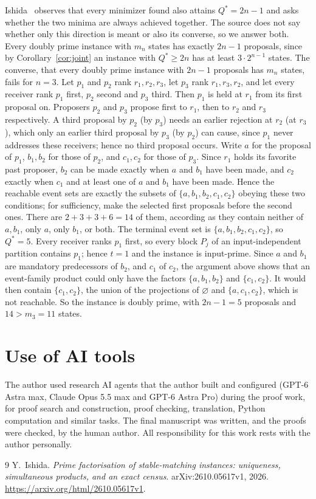 \documentclass[11pt]{article}
\begin{document}
Ishida~\cite[Section~7(A)]{ishida} observes that every minimizer found
also attains $Q^*=2n-1$ and asks whether the two minima are always
achieved together. The source does not say whether only this direction
is meant or also its converse, so we answer both. Every doubly prime
instance with $m_n$ states has exactly $2n-1$ proposals, since by
Corollary~\ref{cor:joint} an instance with $Q^*\ge2n$ has at least
$3\cdot2^{n-1}$ states. The converse, that every doubly prime instance
with $2n-1$ proposals has $m_n$ states, fails for $n=3$. Let $p_1$ and
$p_2$ rank $r_1,r_2,r_3$, let $p_3$ rank $r_1,r_3,r_2$, and let every
receiver rank $p_1$ first, $p_2$ second and $p_3$ third. Then $p_1$ is
held at $r_1$ from its first proposal on. Proposers $p_2$ and $p_3$
propose first to $r_1$, then to $r_2$ and $r_3$ respectively. A third
proposal by $p_2$ (by $p_3$) needs an earlier rejection at $r_2$ (at
$r_3$), which only an earlier third proposal by $p_3$ (by $p_2$) can
cause, since $p_1$ never addresses these receivers; hence no third
proposal occurs. Write $a$ for the proposal of $p_1$, $b_1,b_2$ for
those of $p_2$, and $c_1,c_2$ for those of $p_3$. Since $r_1$ holds its
favorite past proposer, $b_2$ can be made exactly when $a$ and $b_1$
have been made, and $c_2$ exactly when $c_1$ and at least one of $a$
and $b_1$ have been made. Hence the reachable event sets are exactly the
subsets of $\{a,b_1,b_2,c_1,c_2\}$ obeying these two conditions; for
sufficiency, make the selected first proposals before the second ones.
There are $2+3+3+6=14$ of them, according as they contain neither of
$a,b_1$, only $a$, only $b_1$, or both. The terminal event set is
$\{a,b_1,b_2,c_1,c_2\}$, so $Q^*=5$. Every receiver ranks $p_1$ first,
so every block $P_j$ of an input-independent partition contains $p_1$;
hence $t=1$ and the instance is input-prime. Since $a$ and $b_1$ are
mandatory predecessors of $b_2$, and $c_1$ of $c_2$, the argument above
shows that an event-family product could only have the factors
$\{a,b_1,b_2\}$ and $\{c_1,c_2\}$. It would then contain $\{c_1,c_2\}$,
the union of the projections of $\varnothing$ and $\{a,c_1,c_2\}$, which
is not reachable. So the instance is doubly prime, with $2n-1=5$
proposals and $14>m_3=11$ states.

\section*{Use of AI tools}
The author used research AI agents that the author built and configured (GPT-6 Astra max,
Claude Opus 5.5 max and GPT-6 Astra Pro) during the proof work, for proof search and
construction, proof checking, translation, Python computation and similar tasks. The final
manuscript was written, and the proofs were checked, by the human author. All responsibility
for this work rests with the author personally.

\begin{thebibliography}{9}
Y.~Ishida.
\emph{Prime factorisation of stable-matching instances: uniqueness,
simultaneous products, and an exact census}.
arXiv:2610.05617v1, 2026.
\url{https://arxiv.org/html/2610.05617v1}.
\end{thebibliography}
\end{document}
